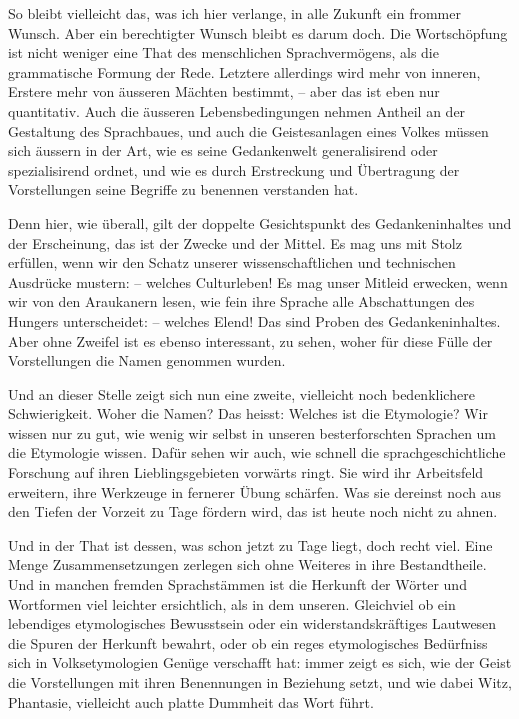 \largerpage[1]So bleibt vielleicht das, was ich hier verlange, in alle Zukunft ein frommer Wunsch. Aber ein berechtigter Wunsch bleibt es darum doch. Die Wortschöpfung ist nicht weniger eine That des menschlichen Sprachvermögens, als die grammatische Formung der Rede. Letztere allerdings wird mehr von inneren, Erstere mehr von äusseren Mächten bestimmt, – aber das ist eben nur quantitativ. Auch die äusseren Lebensbedingungen nehmen Antheil an der Gestaltung des Sprachbaues, und auch die Geistesanlagen eines Volkes müssen sich äussern in der Art, wie es seine Gedankenwelt generalisirend oder spezialisirend ordnet, und wie es durch Erstreckung und Übertragung der Vorstellungen seine Begriffe zu benennen verstanden hat.

Denn hier, wie überall, gilt der doppelte Gesichtspunkt des Gedankeninhaltes und der Erscheinung, das ist der Zwecke und der Mittel. Es mag uns mit Stolz erfüllen, wenn wir den Schatz unserer wissenschaftlichen und technischen Ausdrücke mustern: – welches Culturleben! Es mag unser Mitleid erwecken, wenn wir von den Araukanern lesen, wie fein ihre Sprache alle Abschattungen des Hungers unterscheidet: – welches Elend! Das sind Proben des Gedankeninhaltes. Aber ohne Zweifel ist es ebenso interessant, zu sehen, woher für diese Fülle der Vorstellungen die Namen genommen wurden.

Und an dieser Stelle zeigt sich nun eine zweite, vielleicht noch bedenklichere Schwierigkeit. Woher die Namen? Das heisst: Welches ist \label{fp.464} die Etymologie? Wir wissen  nur zu gut, wie wenig wir selbst in unseren besterforschten Sprachen um die Etymologie wissen. Dafür sehen wir auch, wie schnell die sprachgeschichtliche Forschung auf ihren Lieblingsgebieten vorwärts ringt. Sie wird ihr Arbeitsfeld erweitern, ihre Werkzeuge in fernerer Übung schärfen. Was sie dereinst noch aus den Tiefen der Vorzeit zu Tage fördern wird, das ist heute noch nicht zu ahnen.

Und in der That ist dessen, was schon jetzt zu Tage liegt, doch recht viel. Eine Menge Zusammensetzungen zerlegen sich ohne Weiteres in ihre Bestandtheile. Und in manchen fremden Sprachstämmen ist die Herkunft der Wörter und Wortformen viel leichter ersichtlich, als in dem unseren. Gleichviel ob ein lebendiges etymologisches Bewusstsein oder ein widerstandskräftiges Lautwesen die Spuren der Herkunft bewahrt, oder ob ein reges etymologisches Bedürfniss sich in Volksetymologien Genüge verschafft hat: immer zeigt es sich, wie der Geist die Vorstellungen mit ihren Benennungen in Beziehung setzt, und wie dabei Witz, Phantasie, vielleicht auch platte Dummheit das Wort führt.

